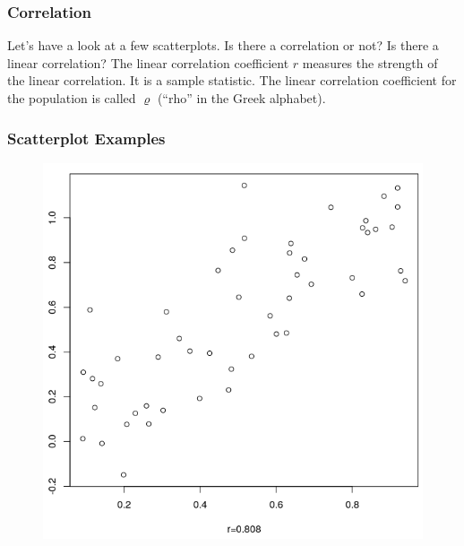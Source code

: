 \documentclass[xcolor=dvipsnames]{beamer}
\begin{document}
\begin{frame}
  \frametitle{Correlation}
  Let's have a look at a few scatterplots. Is there a correlation or
  not? Is there a linear correlation? The \alert{linear correlation
    coefficient} $r$ measures the strength of the linear correlation.
  It is a sample statistic. The linear correlation coefficient for the
  population is called $\varrho$ (``rho'' in the Greek alphabet).
\end{frame}

\begin{frame}
  \frametitle{Scatterplot Examples}
  \begin{figure}[h]
    \includegraphics[scale=0.35]{./diagrams/sc01.png}
  \end{figure}
\end{frame}
\end{document}
